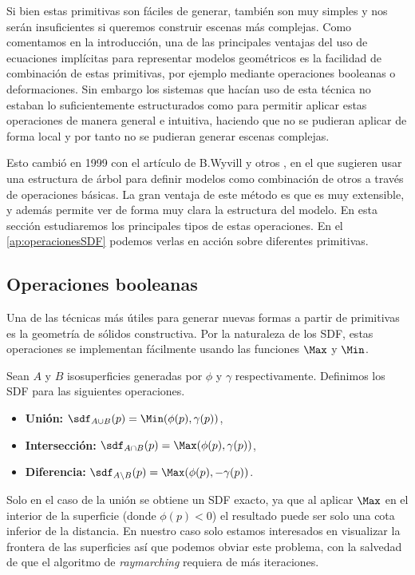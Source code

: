
Si bien estas primitivas son fáciles de generar, también son muy simples y nos serán insuficientes si queremos construir escenas más complejas. Como comentamos en la introducción, una de las principales ventajas del uso de ecuaciones implícitas para representar modelos geométricos es la facilidad de combinación de estas primitivas, por ejemplo mediante operaciones booleanas o deformaciones. Sin embargo los sistemas que hacían uso de esta técnica no estaban lo suficientemente estructurados como para permitir aplicar estas operaciones de manera general e intuitiva, haciendo que no se pudieran aplicar de forma local y por tanto no se pudieran generar escenas complejas.\newline


Esto cambió en 1999 con el artículo de B.Wyvill y otros \cite{blobtree}, en el que sugieren usar una estructura de árbol para definir modelos como combinación de otros a través de operaciones básicas. La gran ventaja de este método es que es muy extensible, y además permite ver de forma muy clara la estructura del modelo. En esta sección estudiaremos los principales tipos de estas operaciones. En el \autoref{ap:operacionesSDF} podemos verlas en acción sobre diferentes primitivas.

\subsection{Operaciones booleanas}
Una de las técnicas más útiles para generar nuevas formas a partir de primitivas es la geometría de sólidos constructiva. Por la naturaleza de los SDF, estas operaciones se implementan fácilmente usando las funciones $\Max$ y $\Min$.

\begin{definicion}\label{p:boolean}
    Sean $A$ y $B$ isosuperficies generadas por $\phi$ y $\gamma$ respectivamente. Definimos los SDF para las siguientes operaciones.
    \begin{itemize}
        \item \textbf{Unión: } $\sdf_{A\cup B}(p) = \Min(\phi(p), \gamma(p))$,
        \item \textbf{Intersección: } $\sdf_{A\cap B}(p) = \Max(\phi(p), \gamma(p))$,
        \item \textbf{Diferencia: } $\sdf_{A\setminus B}(p) = \Max(\phi(p), -\gamma(p))$.
    \end{itemize}
\end{definicion}

\begin{observacion}
    Solo en el caso de la unión se obtiene un SDF exacto, ya que al aplicar $\Max$ en el interior de la superficie (donde $\phi(p) < 0$) el resultado puede ser solo una cota inferior de la distancia. En nuestro caso solo estamos interesados en visualizar la frontera de las superficies así que podemos obviar este problema, con la salvedad de que el algoritmo de \textit{raymarching} requiera de más iteraciones.
\end{observacion}

